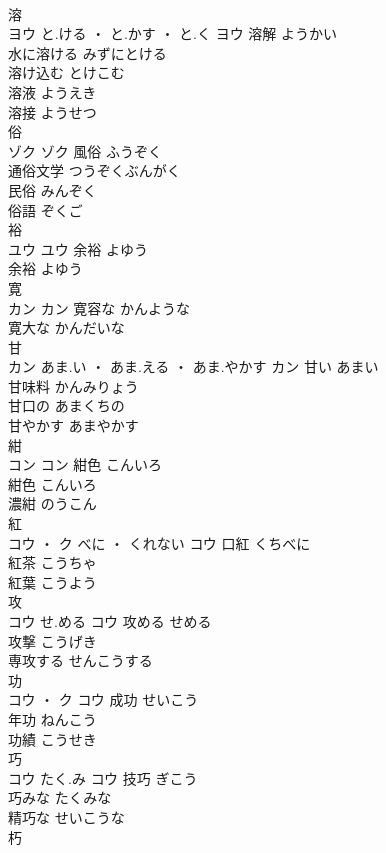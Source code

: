 \documentclass[8pt]{extreport}
\begin{document}
\begin{CJK}{UTF8}{min}
\\	溶	
\\	ヨウ	と.ける ・ と.かす ・ と.く	ヨウ	溶解	ようかい	
\\	水に溶ける	みずにとける	
\\	溶け込む	とけこむ	
\\	溶液	ようえき	
\\	溶接	ようせつ	
\\	俗	
\\	ゾク		ゾク	風俗	ふうぞく	
\\	通俗文学	つうぞくぶんがく	
\\	民俗	みんぞく	
\\	俗語	ぞくご	
\\	裕	
\\	ユウ		ユウ	余裕	よゆう	
\\	余裕	よゆう	
\\	寛	
\\	カン		カン	寛容な	かんような	
\\	寛大な	かんだいな	
\\	甘	
\\	カン	あま.い ・ あま.える ・ あま.やかす	カン	甘い	あまい	
\\	甘味料	かんみりょう	
\\	甘口の	あまくちの	
\\	甘やかす	あまやかす	
\\	紺	
\\	コン		コン	紺色	こんいろ	
\\	紺色	こんいろ	
\\	濃紺	のうこん	
\\	紅	
\\	コウ ・ ク	べに ・ くれない	コウ	口紅	くちべに	
\\	紅茶	こうちゃ	
\\	紅葉	こうよう	
\\	攻	
\\	コウ	せ.める	コウ	攻める	せめる	
\\	攻撃	こうげき	
\\	専攻する	せんこうする	
\\	功	
\\	コウ ・ ク		コウ	成功	せいこう	
\\	年功	ねんこう	
\\	功績	こうせき	
\\	巧	
\\	コウ	たく.み	コウ	技巧	ぎこう	
\\	巧みな	たくみな	
\\	精巧な	せいこうな	
\\	朽	

\end{CJK}
\end{document}
